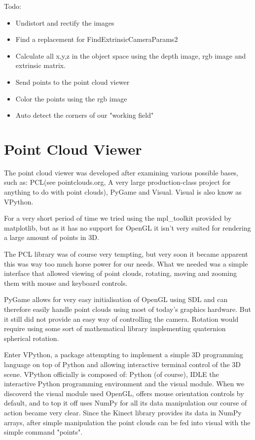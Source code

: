 Todo: 

\begin{itemize}

\item Undistort and rectify the images%

\item Find a replacement for FindExtrinsicCameraParams2%

\item Calculate all x,y,z in the object space using the depth image, rgb image and extrinsic matrix.%

\item Send points to the point cloud viewer%

\item Color the points using the rgb image%

\item Auto detect the corners of our "working field"%

\end{itemize}

\section{Point Cloud Viewer}

The point cloud viewer was developed after examining various possible
bases, such as: PCL(see pointclouds.org, A very large production-class project for
anything to do with point clouds), PyGame and Visual. Visual is also know
as VPython.

For a very short period of time we tried using the mpl\_toolkit provided
by matplotlib, but as it has no support for OpenGL it isn't very suited
for rendering a large amount of points in 3D.

The PCL library was of course
very tempting, but very soon it became apparent this was way too much horse
power for our needs. What we needed was a simple interface that allowed viewing
of point clouds, rotating, moving and zooming them with mouse and keyboard
controls.

PyGame allows for very easy initialisation of OpenGL using SDL and can therefore
easily handle point clouds using most of today's graphics hardware. But it still
did not provide an easy way of controlling the camera. Rotation would require
using some sort of mathematical library implementing quaternion spherical rotation.

Enter VPython, a package attempting to implement a simple 3D programming
language on top of Python and allowing interactive terminal control of the
3D scene. VPython officially is composed of: Python (of course), IDLE the
interactive Python programming environment and the visual module. When we
discoverd the visual module used OpenGL, offers mouse orientation
controls by default, and to top it off uses NumPy for all its data manipulation
our course of action became very clear. Since the Kinect library provides its
data in NumPy arrays, after simple manipulation the point clouds can be fed into
visual with the simple command "points".

